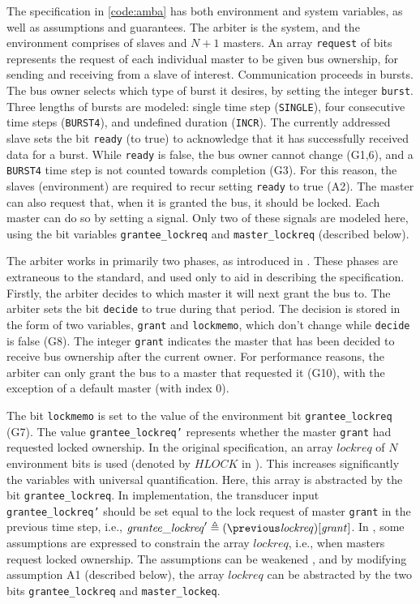 \documentclass[copyright]{eptcs}
\begin{document}
The specification in \cref{code:amba} has both environment and system variables, as well as assumptions and guarantees.
The arbiter is the system, and the environment comprises of slaves and $N + 1$ masters.
An array \texttt{request} of bits represents the request of each individual master to be given bus ownership, for sending and receiving from a slave of interest.
Communication proceeds in bursts.
The bus owner selects which type of burst it desires, by setting the integer \texttt{burst}.
Three lengths of bursts are modeled: single time step (\texttt{SINGLE}), four consecutive time steps (\texttt{BURST4}), and undefined duration (\texttt{INCR}).
The currently addressed slave sets the bit \texttt{ready} (to true) to acknowledge that it has successfully received data for a burst.
While \texttt{ready} is false, the bus owner cannot change (G1,6), and a \texttt{BURST4} time step is not counted towards completion (G3).
For this reason, the slaves (environment) are required to recur setting \texttt{ready} to true (A2).
The master can also request that, when it is granted the bus, it should be locked.
Each master can do so by setting a signal.
Only two of these signals are modeled here, using the bit variables \texttt{grantee\_lockreq} and \texttt{master\_lockreq} (described below).

The arbiter works in primarily two phases, as introduced in \cite{Bloem12jcss}.
These phases are extraneous to the standard, and used only to aid in describing the specification.
Firstly, the arbiter decides to which master it will next grant the bus to.
The arbiter sets the bit \texttt{decide} to true during that period.
The decision is stored in the form of two variables, \texttt{grant} and \texttt{lockmemo}, which don't change while \texttt{decide} is false (G8).
The integer \texttt{grant} indicates the master that has been decided to receive bus ownership after the current owner.
For performance reasons, the arbiter can only grant the bus to a master that requested it (G10), with the exception of a default master (with index 0).

The bit \texttt{lockmemo} is set to the value of the environment bit \texttt{grantee\_lockreq} (G7).
The value \texttt{grantee\_lockreq'} represents whether the master \texttt{grant} had requested locked ownership.
In the original specification, an array $\mathit{lockreq}$ of $N$ environment bits is used (denoted by $\mathit{HLOCK}$ in \cite{Bloem12jcss}).
This increases significantly the variables with universal quantification.
Here, this array is abstracted by the bit \texttt{grantee\_lockreq}.
In implementation, the transducer input \texttt{grantee\_lockreq'} should be set equal to the lock request of master \texttt{grant} in the previous time step, i.e., $\mathit{grantee\_lockreq}' \triangleq (\previous \mathit{lockreq})[\mathit{grant}]$.
In \cite{Bloem12jcss}, some assumptions are expressed to constrain the array $\mathit{lockreq}$, i.e., when masters request locked ownership.
The assumptions can be weakened \cite{Filippidis15cds4-amba}, and by modifying assumption A1 (described below), the array $\mathit{lockreq}$ can be abstracted by the two bits \texttt{grantee\_lockreq} and \texttt{master\_lockeq}.
\end{document}
